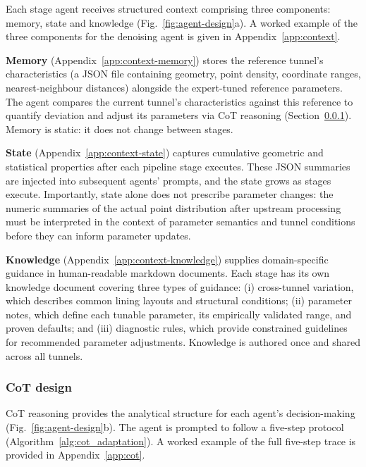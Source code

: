 \documentclass[a4paper,fleqn]{cas-dc}
\begin{document}
{Each stage agent receives structured context comprising three components: memory, state and knowledge (Fig.~\ref{fig:agent-design}a). A worked example of the three components for the denoising agent is given in Appendix~\ref{app:context}.

\textbf{Memory} (Appendix~\ref{app:context-memory}) stores the reference tunnel's characteristics (a JSON file containing geometry, point density, coordinate ranges, nearest-neighbour distances) alongside the expert-tuned reference parameters. The agent compares the current tunnel's characteristics against this reference to quantify deviation and adjust its parameters via CoT reasoning (Section~\ref{sec:cot}). Memory is static: it does not change between stages.


\textbf{State} (Appendix~\ref{app:context-state}) captures cumulative geometric and statistical properties after each pipeline stage executes. These JSON summaries are injected into subsequent agents' prompts, and the state grows as stages execute. Importantly, state alone does not prescribe parameter changes: the numeric summaries of the actual point distribution after upstream processing must be interpreted in the context of parameter semantics and tunnel conditions before they can inform parameter updates.


\textbf{Knowledge} (Appendix~\ref{app:context-knowledge}) supplies domain-specific guidance in human-readable markdown documents. Each stage has its own knowledge document covering three types of guidance: (i) cross-tunnel variation, which describes common lining layouts and structural conditions; (ii) parameter notes, which define each tunable parameter, its empirically validated range, and proven defaults; and (iii) diagnostic rules, which provide constrained guidelines for recommended parameter adjustments. Knowledge is authored once and shared across all tunnels. 



\subsubsection{CoT design}\label{sec:cot}

CoT reasoning provides the analytical structure for each agent's decision-making (Fig.~\ref{fig:agent-design}b). The agent is prompted to follow a five-step protocol (Algorithm~\ref{alg:cot_adaptation}). A worked example of the full five-step trace is provided in Appendix~\ref{app:cot}.

}
\end{document}
